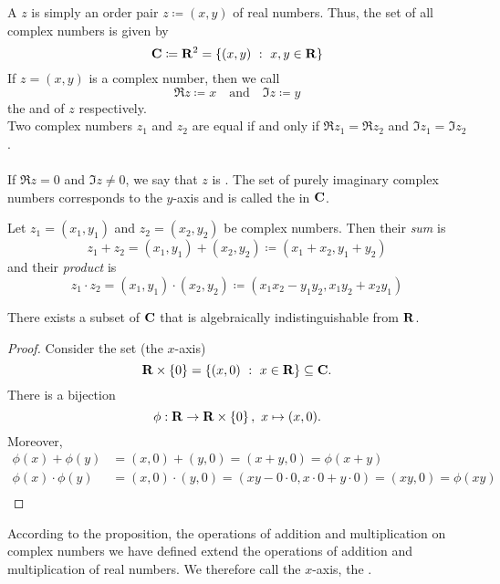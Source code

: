 \begin{definition}
A  $z$ is simply an order pair $z \coloneqq (x,y)$ of real numbers. Thus, the set of all complex numbers is given by
\[\mathbf C \coloneqq \mathbf R^2 = \left\{(x,y)\ :\ x,y\in \mathbf R\right\}\]
If $z = (x,y)$ is a complex number, then we call 
\[\Re z \coloneqq x \quad \text{and} \quad \Im z \coloneqq y\]
the  and  of $z$ respectively.\\[0.5em]
Two complex numbers $z_1$ and $z_2$ are equal if and only if $\Re z_1 = \Re z_2$ and $\Im z_1 = \Im z_2$.\\
\\
If $\Re z = 0$ and $\Im z \neq 0$, we say that $z$ is . The set of purely imaginary complex numbers corresponds to the $y$-axis and is called the  in $\mathbf C$.
\end{definition}

\medskip

\begin{definition}
Let $z_1 = (x_1,y_1)$ and $z_2 = (x_2,y_2)$ be complex numbers. Then their \emph{sum} is
\[z_1 + z_2 = (x_1,y_1) + (x_2,y_2) \coloneqq (x_1 + x_2,y_1 + y_2)\]
and their \emph{product} is 
\[z_1 \cdot z_2 = (x_1,y_1) \cdot (x_2,y_2) \coloneqq (x_1x_2 - y_1y_2, x_1y_2 + x_2y_1)\]
\end{definition}

\medskip

\begin{proposition}
There exists a subset of $\mathbf C$ that is algebraically indistinguishable from $\mathbf R$.
\end{proposition}
\begin{proof}
Consider the set (the $x$-axis)
\[\mathbf R \times \left\{0\right\} = \left\{(x,0)\ :\ x\in \mathbf R\right\} \subseteq \mathbf C.\]
There is a bijection
\[\phi:\mathbf R \to \mathbf R \times \left\{0\right\},\ x \mapsto (x,0).\]
Moreover, 
\begin{align*}
\phi(x) + \phi(y) &= (x,0) + (y,0) = (x+y,0) = \phi(x+y)\\[0.5em]
\phi(x)\cdot\phi(y) &= (x,0)\cdot (y,0) = (xy - 0\cdot 0,x\cdot 0 + y\cdot 0) = (xy,0) = \phi(xy)\\[-2.5em]
\end{align*}
\end{proof}
According to the proposition, the operations of addition and multiplication on complex numbers we have defined extend the operations of addition and multiplication of real numbers. We therefore call the $x$-axis, the .

